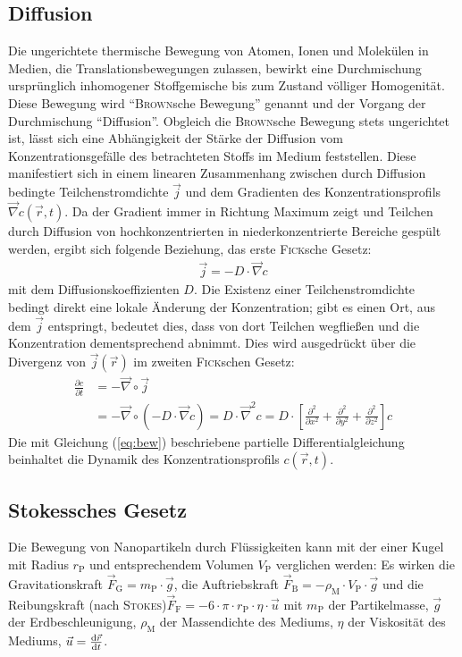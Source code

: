 \documentclass[numbers=noenddot,12pt,a4paper]{scrartcl}
\newcommand{\diff}{\textnormal{d}}
\newcommand{\ix}[1]{_\text{#1}}
\begin{document}
\subsection{Diffusion}
Die ungerichtete thermische Bewegung von Atomen, Ionen und Molekülen in Medien, die Translationsbewegungen zulassen, bewirkt eine Durchmischung ursprünglich inhomogener Stoffgemische bis zum Zustand völliger Homogenität. Diese Bewegung wird "`\textsc{Brown}sche Bewegung"' genannt und der Vorgang der Durchmischung "`Diffusion"'. Obgleich die \textsc{Brown}sche Bewegung stets ungerichtet ist, lässt sich eine Abhängigkeit der Stärke der Diffusion vom Konzentrationsgefälle des betrachteten Stoffs im Medium feststellen. Diese manifestiert sich in einem linearen Zusammenhang zwischen durch Diffusion bedingte Teilchenstromdichte $\vec{j}$ und dem Gradienten des Konzentrationsprofils $\vec{\nabla} c(\vec{r},t)$. Da der Gradient immer in Richtung Maximum zeigt und Teilchen durch Diffusion von hochkonzentrierten in niederkonzentrierte Bereiche gespült werden, ergibt sich folgende Beziehung, das erste \textsc{Fick}sche Gesetz:
\begin{align}\label{eq:grad}
\vec{j}=-D\cdot\vec{\nabla}c
\end{align}
mit dem Diffusionskoeffizienten $D$. Die Existenz einer Teilchenstromdichte bedingt direkt eine lokale Änderung der Konzentration; gibt es einen Ort, aus dem $\vec{j}$ entspringt, bedeutet dies, dass von dort Teilchen wegfließen und die Konzentration dementsprechend abnimmt. Dies wird ausgedrückt über die Divergenz von $\vec{j}\left(\vec{r}\right)$ im zweiten \textsc{Fick}schen Gesetz:
\begin{align}
\frac{\partial c}{\partial t}&=-\vec{\nabla}\circ\vec{j}\\
&=-\vec{\nabla}\circ(-D\cdot\vec{\nabla} c)=D\cdot\vec{\nabla}^2c=D\cdot\left[\frac{\partial^2}{\partial x^2}+\frac{\partial^2}{\partial y^2}+\frac{\partial^2}{\partial z^2}\right]c\label{eq:bew}
\end{align}
Die mit Gleichung (\ref{eq:bew}) beschriebene partielle Differentialgleichung beinhaltet die Dynamik des Konzentrationsprofils $c(\vec{r},t)$.
\subsection{Stokessches Gesetz}
Die Bewegung von Nanopartikeln durch Flüssigkeiten kann mit der einer Kugel mit Radius $r\ix{P}$ und entsprechendem Volumen $V\ix{P}$ verglichen werden: Es wirken die Gravitationskraft $\vec{F}\ix{G}=m\ix{P}\cdot\vec{g}$, die Auftriebskraft $\vec{F}\ix{B}=-\rho\ix{M}\cdot V\ix{P}\cdot\vec{g}$ und die Reibungskraft (nach \textsc{Stokes})\linebreak$\vec{F}\ix{F}=-6\cdot\pi\cdot r\ix{P}\cdot\eta\cdot\vec{u}$ mit $m\ix{P}$ der Partikelmasse, $\vec{g}$ der Erdbeschleunigung, $\rho\ix{M}$ der Massendichte des Mediums, $\eta$ der Viskosität des Mediums, $\vec{u}=\frac{\diff \vec{r}}{\diff t}$.
\end{document}
